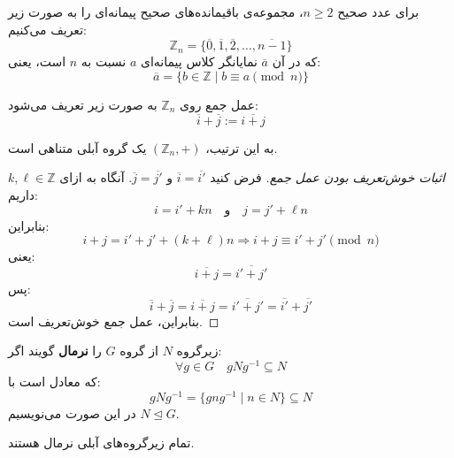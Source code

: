 \begin{frame}
    \begin{definition}
        برای عدد صحیح \( n \geq 2 \)، مجموعه‌ی باقیمانده‌های صحیح پیمانه‌ای را به صورت زیر تعریف می‌کنیم:
        \[
            \mathbb{Z}_n = \{ \overline{0}, \overline{1}, \overline{2}, \ldots, \overline{n-1} \}
        \]
        که در آن \( \overline{a} \) نمایانگر کلاس پیمانه‌ای \( a \) نسبت به \( n \) است، یعنی:
        \[
            \overline{a} = \{ b \in \mathbb{Z} \mid b \equiv a \pmod{n} \}
        \]

        عمل جمع روی \( \mathbb{Z}_n \) به صورت زیر تعریف می‌شود:
        \[
            \overline{i} + \overline{j} := \overline{i + j}
        \]

        به این ترتیب، \( (\mathbb{Z}_n, +) \) یک گروه آبلی متناهی است.
    \end{definition}


\end{frame}

\begin{frame}
    \begin{proof}[اثبات خوش‌تعریف بودن عمل جمع]
        فرض کنید \( \overline{i} = \overline{i'} \) و \( \overline{j} = \overline{j'} \).
        آنگاه به ازای \( k, \ell \in \mathbb{Z} \) داریم:
        \[
            i = i' + kn \quad \text{و} \quad j = j' + \ell n
        \]
        بنابراین:
        \[
            i + j = i' + j' + (k + \ell)n \Rightarrow i + j \equiv i' + j' \pmod{n}
        \]
        یعنی:
        \[
            \overline{i + j} = \overline{i' + j'}
        \]
        پس:
        \[
            \overline{i} + \overline{j} = \overline{i + j} = \overline{i' + j'} = \overline{i'} + \overline{j'}
        \]
        بنابراین، عمل جمع خوش‌تعریف است.
    \end{proof}

\end{frame}

\begin{frame}
    \begin{definition}
        زیرگروه \( N \) از گروه \( G \) را \textbf{نرمال} گویند اگر:
        \[
            \forall g \in G \quad gNg^{-1} \subseteq N
        \]
        که معادل است با:
        \[
            gNg^{-1} = \{ gng^{-1} \mid n \in N \} \subseteq N
        \]
        در این صورت می‌نویسیم \( N \trianglelefteq G \).

    \end{definition}
    \begin{example}
        تمام زیرگروه‌های آبلی نرمال هستند.
    \end{example}
\end{frame}

